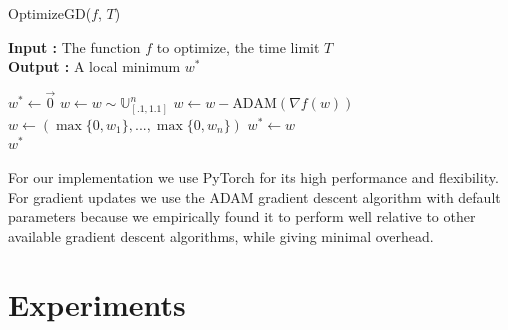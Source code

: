 \documentclass[a4paper]{article}
\begin{document}
\begin{algorithm}[H]
\caption{OptimizeGD($f$, $T$)}
\textbf{Input : } The function $f$ to optimize, the time limit $T$\\
\textbf{Output : } A local minimum $w^*$
\begin{algorithmic}[1]
	\State $w^* \gets \overrightarrow{0}$ 
		\State $w \gets w \sim \mathds{U}_{[.1,1.1]}^n$ 
				\State $w \gets w - \text{ADAM}(\nabla f(w))$ 
				\State $w \gets (\max\{0, w_1\},..., \max\{0, w_n\})$ 
			\EndFor
				\State $w^* \gets w$ 
			\EndIf
		\EndFor
	\EndWhile
	\\\Return $w^*$
\end{algorithmic}
\end{algorithm}

For our implementation we use PyTorch \cite{pytorch} for its high performance
and flexibility. For gradient updates we use the ADAM gradient descent algorithm with default parameters
\cite{ADAM_paper} because we empirically found it to perform well relative to
other available gradient descent algorithms, while giving minimal overhead. 

\section{Experiments}
\end{document}

